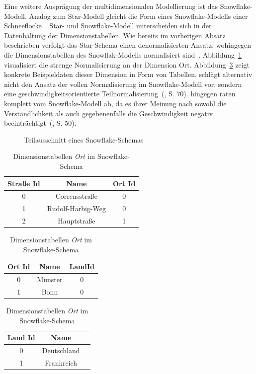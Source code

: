 \documentclass[
  language=german, %
  type=bachelor,%
  ngerman
]{isthesis}
\begin{document}
\begin{content}
  Eine weitere Ausprägung der multidimensionalen Modellierung ist das Snowflake-Modell.
  Analog zum Star-Modell gleicht die Form eines Snowflake-Modells einer
  Schneeflocke~\cite[][S. 70]{Kemper2010}. Star- und Snowflake-Modell
  unterscheiden sich in der Datenhaltung der Dimensionstabellen. Wie bereits im
  vorherigen Absatz beschrieben verfolgt das Star-Schema einen denormalisierten
  Ansatz, wohingegen die Dimensionstabellen des Snowflak-Modells normalisiert
  sind~\cite[][S. 70]{Kemper2010}. Abbildung~\ref{fig:snowflake-schema}
  visualisiert die strenge Normalisierung an der Dimension Ort.
  Abbildung~\ref{table:dimension-table-snow} zeigt konkrete Beispieldaten dieser
  Dimension in Form von Tabellen.  \textsc{\citeauthor{Kemper2010}} schlägt alternativ
  nicht den Ansatz der vollen Normalisierung im Snowflake-Modell vor, sondern eine
  geschwindigkeitsorientierte Teilnormalisierung~(\citeyear{Kemper2010}, S. 70).
  \textsc{\citeauthor{Kimball2013}} hingegen raten komplett vom Snowflake-Modell
  ab, da es ihrer Meinung nach sowohl die Verständlichkeit als auch gegebenenfalls die
  Geschwindigkeit negativ beeinträchtigt~(\citeyear{Kimball2013}, S. 50).

  \begin{figure}
    \resizebox{250pt}{!}{}
    \caption{Teilausschnitt eines Snowflake-Schemas}\label{fig:snowflake-schema}
  \end{figure}

  \begin{table}
    \footnotesize
    \begin{tabular}[t]{c c c }
      Straße Id & Name & Ort Id \\
      \toprule
      0 & Corrensstraße & 0 \\
      1 & Rudolf-Harbig-Weg & 0 \\
      2 & Hauptstraße & 1 \\
    \end{tabular}
		\hfill
    \begin{tabular}[t]{c c c}
      Ort Id & Name & LandId \\
      \toprule
      0 & Münster & 0 \\
      1 & Bonn & 0 \\
    \end{tabular}
		\hfill
    \begin{tabular}[t]{c c c }
      Land Id & Name \\
      \toprule
      0 & Deutschland \\
      1 & Frankreich \\
    \end{tabular}
    \caption{Dimensionstabellen \textit{Ort} im Snowflake-Schema}\label{table:dimension-table-snow}
  \end{table}


\end{content}
\end{document}
